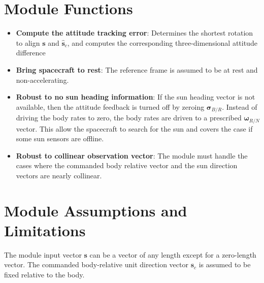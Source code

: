 

\section{Module Functions}
\begin{itemize}
	\item \textbf{Compute the attitude tracking error}: Determines the shortest rotation to align $\bm s$ and $\hat{\bm s}_{c}$, and computes the corresponding three-dimensional attitude difference
	\item \textbf{Bring spacecraft to rest}: The reference frame is assumed to be at rest and non-accelerating.  
	
	\item \textbf{Robust to no sun heading information}: If the sun heading vector is not available, then the attitude feedback is turned off by zeroing $\bm\sigma_{B/R}$.  Instead of driving the body rates to zero, the body rates are driven to a prescribed $\bm\omega_{R/N}$ vector.  This allow the spacecraft to search for the sun and covers the case if some sun sensors are offline.  
	
	\item \textbf{Robust to collinear observation vector}:  The module must handle the cases where the commanded body relative vector and the sun direction vectors are nearly collinear. 
\end{itemize}

\section{Module Assumptions and Limitations}
The module input vector $\bm s$ can be a vector of any length except for a zero-length vector.  The commanded body-relative unit direction vector ${\bm s}_{c}$ is assumed to be fixed relative to the body.  